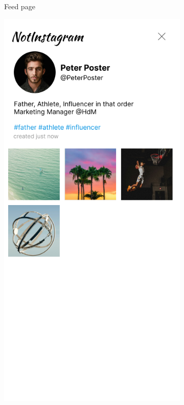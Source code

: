 \documentclass[a4paper, 12pt]{article}
\begin{document}
\begin{figure}[h]
\begin{subfigure}{0.24\linewidth}
\begin{center}
    \end{center}
    \caption{Feed page}\label{subfig:index}
  \end{subfigure}
  \begin{subfigure}{0.24\linewidth}
    \begin{center}
      \includegraphics[width=\linewidth, height=0.3\textheight, keepaspectratio,frame]{img/ig-clone/Profil.png}

\end{center}
\end{subfigure}
\end{figure}
\end{document}
